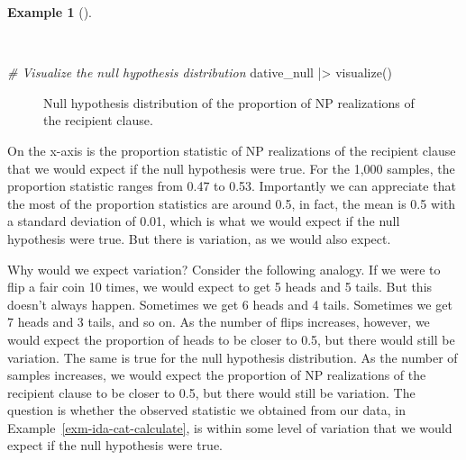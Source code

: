 \documentclass[
  letterpaper,
]{latex/krantz}
\newenvironment{Shaded}{\begin{snugshade}}{\end{snugshade}}
\newcommand{\CommentTok}[1]{\textcolor[rgb]{0.00,0.00,0.00}{\textit{#1}}}
\newcommand{\FunctionTok}[1]{\textcolor[rgb]{0.00,0.00,0.00}{#1}}
\newcommand{\NormalTok}[1]{\textcolor[rgb]{0.00,0.00,0.00}{#1}}
\newcommand{\SpecialCharTok}[1]{\textcolor[rgb]{0.00,0.00,0.00}{#1}}
\theoremstyle{definition}
\newtheorem{example}{Example}[chapter]
\theoremstyle{remark}
\begin{document}
\begin{example}[]\protect\hypertarget{exm-ida-cat-null-hypothesis}{}\label{exm-ida-cat-null-hypothesis}

~

\begin{Shaded}
\begin{Highlighting}[]
\CommentTok{\# Visualize the null hypothesis distribution}
\NormalTok{dative\_null }\SpecialCharTok{|\textgreater{}} \FunctionTok{visualize}\NormalTok{()}
\end{Highlighting}
\end{Shaded}

\begin{figure}[H]


\caption{\label{fig-ida-cat-null-hypothesis}Null hypothesis distribution
of the proportion of NP realizations of the recipient clause.}

\end{figure}%

\end{example}

On the x-axis is the proportion statistic of NP realizations of the
recipient clause that we would expect if the null hypothesis were true.
For the 1,000 samples, the proportion statistic ranges from 0.47 to
0.53. Importantly we can appreciate that the most of the proportion
statistics are around 0.5, in fact, the mean is 0.5 with a standard
deviation of 0.01, which is what we would expect if the null hypothesis
were true. But there is variation, as we would also expect.

Why would we expect variation? Consider the following analogy. If we
were to flip a fair coin 10 times, we would expect to get 5 heads and 5
tails. But this doesn't always happen. Sometimes we get 6 heads and 4
tails. Sometimes we get 7 heads and 3 tails, and so on. As the number of
flips increases, however, we would expect the proportion of heads to be
closer to 0.5, but there would still be variation. The same is true for
the null hypothesis distribution. As the number of samples increases, we
would expect the proportion of NP realizations of the recipient clause
to be closer to 0.5, but there would still be variation. The question is
whether the observed statistic we obtained from our data, in
Example~\ref{exm-ida-cat-calculate}, is within some level of variation
that we would expect if the null hypothesis were true.
\end{document}
